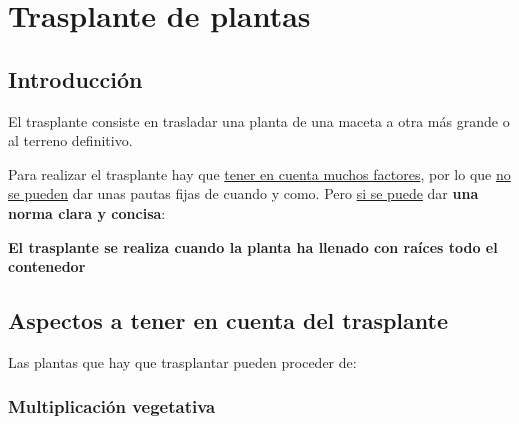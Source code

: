 \documentclass[a4paper,12pt,oneside]{article}
\begin{document}
\section{Trasplante de plantas}
\label{sec:orgedb1d01}
\subsection{Introducción}
\label{sec:org3cf334b}
El trasplante consiste en trasladar una planta de una maceta a otra más grande
o al terreno definitivo.

Para realizar el trasplante hay que \uline{tener en cuenta muchos factores}, por lo
que \uline{no se pueden} dar unas pautas fijas de cuando y como. Pero \uline{si se puede}
dar \textbf{una norma clara y concisa}:
\begin{center}
\textbf{El trasplante se realiza cuando la planta ha llenado con raíces todo el
 contenedor} 
\end{center}
\subsection{Aspectos a tener en cuenta del trasplante}
\label{sec:org13e8aa5}
Las plantas que hay que trasplantar pueden proceder de:
\subsubsection{Multiplicación vegetativa}
\label{sec:org39fd7af}
\end{document}
